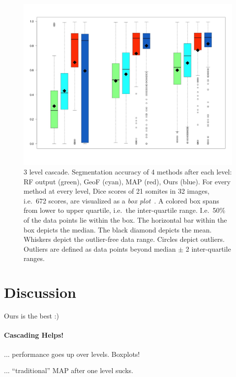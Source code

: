 \documentclass[10pt,twocolumn,letterpaper]{article}
\begin{document}
\begin{figure}[tb]
\centering
\small
\begin{center}
\includegraphics[width=\columnwidth]{Cascade.jpeg} %
\end{center}
\label{fig:boxplots}
\caption{3 level cascade. Segmentation accuracy of 4 methods after each level: RF output (green), GeoF (cyan), MAP (red), Ours (blue). For every method at every level, Dice scores of 21 somites in 32 images, i.e.\ 672 scores, are visualized as a \emph{box plot}~\cite{chambers1983graphical}. A colored box spans from lower to upper quartile, i.e.\ the inter-quartile range. I.e.\ 50\% of the data points lie within the box. The horizontal bar within the box depicts the median. The black diamond depicts the mean. Whiskers depict the outlier-free data range. Circles depict outliers. Outliers are defined as data points beyond median $\pm$ 2 inter-quartile ranges. }
\end{figure}

\section{Discussion}
Ours is the best :)

\paragraph{Cascading Helps!}
... performance goes up over levels. Boxplots!

... "`traditional"' MAP after one level sucks. 
\end{document}

